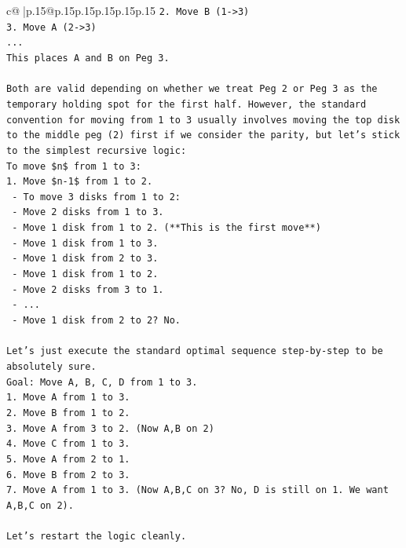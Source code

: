 \documentclass{article}
\begin{document}
{\begin{supertabular}{c@{$\;$}|p{.15\linewidth}@{}p{.15\linewidth}p{.15\linewidth}p{.15\linewidth}p{.15\linewidth}p{.15\linewidth}}
{{{\texttt{2. Move B (1{-}>3)} \\
\texttt{3. Move A (2{-}>3)} \\
\texttt{...} \\
\texttt{This places A and B on Peg 3.} \\
\\ 
\texttt{Both are valid depending on whether we treat Peg 2 or Peg 3 as the temporary holding spot for the first half. However, the standard convention for moving from 1 to 3 usually involves moving the top disk to the middle peg (2) first if we consider the parity, but let's stick to the simplest recursive logic:} \\
\texttt{To move \$n\$ from 1 to 3:} \\
\texttt{1. Move \$n{-}1\$ from 1 to 2.} \\
\texttt{   {-} To move 3 disks from 1 to 2:} \\
\texttt{     {-} Move 2 disks from 1 to 3.} \\
\texttt{       {-} Move 1 disk from 1 to 2. (**This is the first move**)} \\
\texttt{       {-} Move 1 disk from 1 to 3.} \\
\texttt{       {-} Move 1 disk from 2 to 3.} \\
\texttt{     {-} Move 1 disk from 1 to 2.} \\
\texttt{     {-} Move 2 disks from 3 to 1.} \\
\texttt{       {-} ...} \\
\texttt{     {-} Move 1 disk from 2 to 2? No.} \\
\\ 
\texttt{Let's just execute the standard optimal sequence step{-}by{-}step to be absolutely sure.} \\
\texttt{Goal: Move A, B, C, D from 1 to 3.} \\
\texttt{1. Move A from 1 to 3.} \\
\texttt{2. Move B from 1 to 2.} \\
\texttt{3. Move A from 3 to 2. (Now A,B on 2)} \\
\texttt{4. Move C from 1 to 3.} \\
\texttt{5. Move A from 2 to 1.} \\
\texttt{6. Move B from 2 to 3.} \\
\texttt{7. Move A from 1 to 3. (Now A,B,C on 3? No, D is still on 1. We want A,B,C on 2).} \\
\\ 
\texttt{Let's restart the logic cleanly.} \\
}}}
\end{supertabular}}
\end{document}
